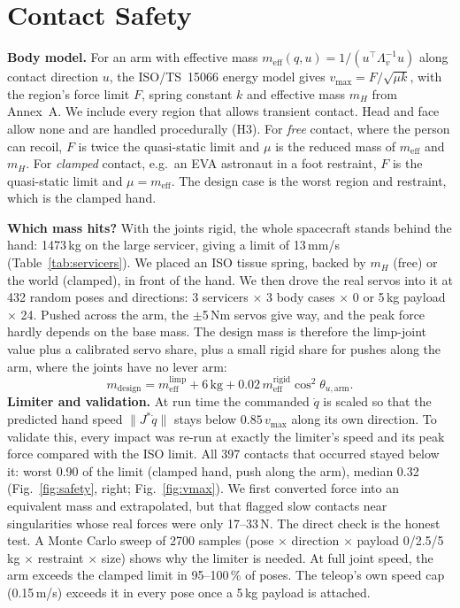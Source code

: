 \documentclass[conference]{IEEEtran}
\newcommand{\qd}{\dot{q}}
\newcommand{\Js}{{J^{*}}}
\begin{document}
\section{Contact Safety}\label{sec:safety}
\textbf{Body model.} For an arm with effective mass $m_{\text{eff}}(q,u)=1/(u^\top\Lambda_v^{-1}u)$ along
contact direction $u$, the ISO/TS~15066 energy model gives $v_{\max} = F/\sqrt{\mu k}$, with the region's force
limit $F$, spring constant $k$ and effective mass $m_H$ from Annex~A. We include every region that allows
transient contact. Head and face allow none and are handled procedurally (H3). For \emph{free} contact, where
the person can recoil, $F$ is twice the quasi-static limit and $\mu$ is the reduced mass of $m_{\text{eff}}$
and $m_H$. For \emph{clamped} contact, e.g.\ an EVA astronaut in a foot restraint, $F$ is the quasi-static
limit and $\mu=m_{\text{eff}}$. The design case is the worst region and restraint, which is the clamped hand.

\textbf{Which mass hits?} With the joints rigid, the whole spacecraft stands behind the hand: 1473\,kg
on the large servicer, giving a limit of 13\,mm/s (Table~\ref{tab:servicers}). We placed an ISO tissue
spring, backed by $m_H$ (free) or the world (clamped), in front of the hand. We then drove the real servos
into it at 432 random poses and directions: 3 servicers $\times$ 3 body cases $\times$ 0 or 5\,kg payload
$\times$ 24. Pushed across the arm, the $\pm$5\,Nm servos give way, and the peak force hardly depends on
the base mass. The design mass is therefore the limp-joint value plus a calibrated servo share, plus a
small rigid share for pushes along the arm, where the joints have no lever arm:
\begin{equation}
m_{\text{design}} = m_{\text{eff}}^{\text{limp}} + 6\,\text{kg} + 0.02\,m_{\text{eff}}^{\text{rigid}}\cos^2\theta_{u,\text{arm}} .
\end{equation}
\textbf{Limiter and validation.} At run time the commanded $\qd$ is scaled so that the predicted hand speed
$\|\Js\qd\|$ stays below $0.85\,v_{\max}$ along its own direction. To validate this, every impact was
re-run at exactly the limiter's speed and its peak force compared with the ISO limit. All 397 contacts that
occurred stayed below it: worst 0.90 of the limit (clamped hand, push along the arm), median 0.32
(Fig.~\ref{fig:safety}, right; Fig.~\ref{fig:vmax}). We first converted force into an equivalent mass and extrapolated, but that
flagged slow contacts near singularities whose real forces were only 17--33\,N. The direct check is the
honest test. A Monte Carlo sweep of 2700 samples (pose $\times$ direction $\times$ payload 0/2.5/5\,kg
$\times$ restraint $\times$ size) shows why the limiter is needed. At full joint speed, the arm exceeds the
clamped limit in 95--100\,\% of poses. The teleop's own speed cap (0.15\,m/s) exceeds it in every pose
once a 5\,kg payload is attached.
\end{document}
